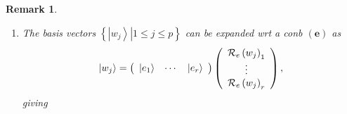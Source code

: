 \documentclass[aps,preprint]{revtex4}%
\newtheorem{remark}[theorem]{Remark}
\begin{document}
\begin{remark}
\begin{enumerate}
\begin{enumerate}
\item The basis vectors $\left\{  \left.  \left\vert w_{j}\right\rangle
\right\vert 1\leq j\leq p\right\}  $ can be expanded wrt a conb $\left(
\boldsymbol{e}\right)  $ as
\begin{equation}
\left\vert w_{j}\right\rangle =\left(
\begin{array}
[c]{ccc}%
\left\vert e_{1}\right\rangle  & \cdots & \left\vert e_{r}\right\rangle
\end{array}
\right)  \left(
\begin{array}
[c]{c}%
\mathcal{R}_{e}\left(  w_{j}\right)  _{1}\\
\vdots\\
\mathcal{R}_{e}\left(  w_{j}\right)  _{r}%
\end{array}
\right)  ,
\end{equation}
giving


\end{enumerate}
\end{enumerate}
\end{remark}
\end{document}
